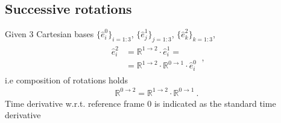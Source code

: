\documentclass[letterpaper,10pt,english]{jupyterBook}
\begin{document}
\subsection{Successive rotations}
\label{\detokenize{ch/kinematics-rotations:successive-rotations}}
\sphinxAtStartPar
{} Given 3 Cartesian bases \(\{ \hat{e}^0_i \}_{i=1:3}\), \(\{ \hat{e}^1_j \}_{j=1:3}\), \(\{ \hat{e}^2_k \}_{k=1:3}\),
\begin{equation*}
\begin{split}\begin{aligned}
 \hat{e}^2_i 
  & = \mathbb{R}^{1 \rightarrow 2} \cdot \hat{e}^1_i = \\ 
  & = \mathbb{R}^{1 \rightarrow 2} \cdot \mathbb{R}^{0 \rightarrow 1} \cdot\hat{e}^0_i 
\end{aligned} \ , \end{split}
\end{equation*}
\sphinxAtStartPar
i.e composition of rotations holds
\begin{equation*}
\begin{split}\mathbb{R}^{0 \rightarrow 2} = \mathbb{R}^{1 \rightarrow 2} \cdot \mathbb{R}^{0 \rightarrow 1} \ .\end{split}
\end{equation*}
\sphinxAtStartPar
{} Time derivative w.r.t. reference frame 0 is indicated as the standard time derivative
\end{document}
